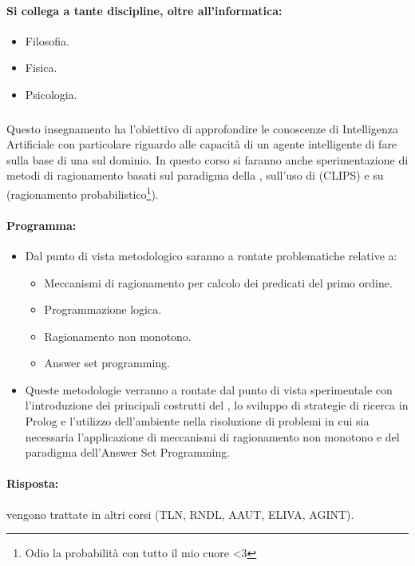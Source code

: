 \paragraph{Si collega a tante discipline, oltre all'informatica:}

\begin{itemize}
  \item Filosofia. 
  \item Fisica. 
  \item Psicologia.
\end{itemize}

\subsubsection{}

Questo insegnamento ha l’obiettivo di approfondire le
conoscenze di Intelligenza Artificiale con particolare riguardo
alle capacità di un agente intelligente di fare  sulla
base di una  sul dominio. In questo corso si faranno anche sperimentazione di metodi di ragionamento basati sul
paradigma della , sull’uso di
 (CLIPS) e su  (ragionamento probabilistico\footnote{Odio la probabilità con tutto il mio cuore <3}).

\paragraph{Programma:}

\begin{itemize}
  \item Dal punto di vista metodologico saranno a rontate problematiche relative a: 
    \begin{itemize}
      \item Meccanismi di ragionamento per calcolo dei predicati del primo
ordine. 
\item Programmazione logica.
\item Ragionamento non monotono. 
\item Answer set programming.
    \end{itemize}
  \item Queste metodologie verranno a rontate dal punto di vista sperimentale con
    l’introduzione dei principali costrutti del , lo sviluppo di strategie di
ricerca in Prolog e l’utilizzo dell’ambiente  nella risoluzione di
problemi in cui sia necessaria l’applicazione di meccanismi di ragionamento
non monotono e del paradigma dell’Answer Set Programming.
\end{itemize}



\paragraph{Risposta:} vengono trattate in altri corsi (TLN, RNDL, AAUT, ELIVA, AGINT).








